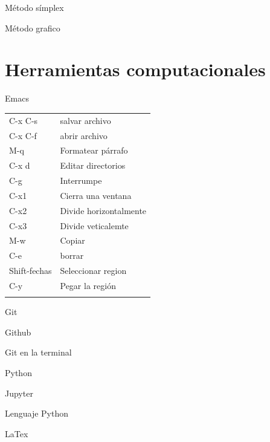 \documentclass[presentation]{beamer}
\begin{document}
\begin{frame}[label={sec:orgccb76cb}]{Método símplex}
\end{frame}
\begin{frame}[label={sec:org60fe1e9}]{Método grafico}
\end{frame}


\section{Herramientas computacionales}
\label{sec:org429300f}

\begin{frame}[label={sec:orgae1a31e}]{Emacs}
\begin{center}
\begin{tabular}{ll}
C-x C-s & salvar archivo\\
C-x C-f & abrir archivo\\
M-q & Formatear párrafo\\
C-x d & Editar directorios\\
C-g & Interrumpe\\
C-x1 & Cierra una ventana\\
C-x2 & Divide horizontalmente\\
C-x3 & Divide veticalemte\\
M-w & Copiar\\
C-e & borrar\\
Shift-fechas & Seleccionar region\\
C-y & Pegar la región\\
 & \\
\end{tabular}
\end{center}
\end{frame}

\begin{frame}[label={sec:org2512f9b}]{Git}
\begin{block}{Github}
\end{block}
\begin{block}{Git en la terminal}
\end{block}
\end{frame}

\begin{frame}[label={sec:org204818b}]{Python}
\begin{block}{Jupyter}
\end{block}
\begin{block}{Lenguaje  Python}
\end{block}
\end{frame}

\begin{frame}[label={sec:org9250dbc}]{LaTex}
\end{frame}
\end{document}
